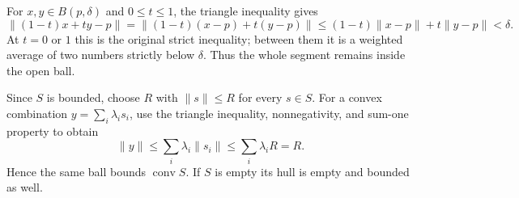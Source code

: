 For $x,y\in B(p,\delta)$ and $0\le t\le1$, the triangle inequality gives
\[
 \|(1-t)x+ty-p\|
 =\|(1-t)(x-p)+t(y-p)\|
 \le(1-t)\|x-p\|+t\|y-p\|<\delta.
\]
At $t=0$ or $1$ this is the original strict inequality; between them it
is a weighted average of two numbers strictly below $\delta$.
Thus the whole segment remains inside the open ball.

Since $S$ is bounded, choose $R$ with $\|s\|\le R$ for every $s\in S$.
For a convex combination $y=\sum_i\lambda_i s_i$, use the triangle
inequality, nonnegativity, and sum-one property to obtain
\[
 \|y\|\le\sum_i\lambda_i\|s_i\|\le\sum_i\lambda_iR=R.
\]
Hence the same ball bounds $\operatorname{conv}S$.
If $S$ is empty its hull is empty and bounded as well.
